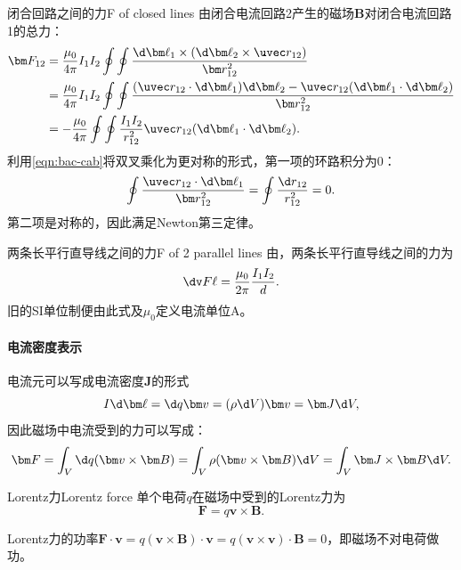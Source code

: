 \begin{example}{闭合回路之间的力}{F of closed lines}
    由闭合电流回路2产生的磁场$\bm B$对闭合电流回路1的总力：
    \begin{align*}
        \bm F_{12}&=\frac{\mu_0}{4\pi}I_1I_2\oint\oint\frac{\d\bm\ell_1\times(\d\bm\ell_2\times\uvec r_{12})}{\bm r_{12}^2}\\
        &=\frac{\mu_0}{4\pi}I_1I_2\oint\oint\frac{(\uvec r_{12}\cdot\d\bm\ell_1)\d\bm\ell_2-\uvec r_{12}(\d\bm\ell_1\cdot\d\bm\ell_2)}{\bm r_{12}^2}\\
        &=-\frac{\mu_0}{4\pi}\oint\oint\frac{I_1I_2}{r_{12}^2}\uvec r_{12}(\d\bm\ell_1\cdot\d\bm\ell_2).
    \end{align*}
    利用\eqref{eqn:bac-cab}将双叉乘化为更对称的形式，第一项的环路积分为0：
    \[
        \oint\frac{\uvec r_{12}\cdot\d\bm\ell_1}{\bm r_{12}^2}=\oint\frac{\d r_{12}}{r_{12}^2}=0.
    \]
    第二项是对称的，因此满足Newton第三定律。
\end{example}
\begin{example}{两条长平行直导线之间的力}{F of 2 parallel lines}
    由，两条长平行直导线之间的力为
    \begin{equation}
        \dv F\ell=\frac{\mu_0}{2\pi}\frac{I_1I_2}d.
    \end{equation}
    旧的SI单位制便由此式及$\mu_0$定义电流单位A。
\end{example}

\paragraph{电流密度表示}

电流元可以写成电流密度$\bm J$的形式
\[
    I\d\bm\ell=\d q\bm v=(\rho\d V)\bm v=\bm J\d V,
\]
因此磁场中电流受到的力可以写成：
\[
    \bm F=\int_V\d q(\bm v\times\bm B)=\int_V\rho(\bm v\times\bm B)\d V=\int_V\bm J\times\bm B\d V.
\]
\begin{definition}
    {Lorentz力}{Lorentz force}
    单个电荷$q$在磁场中受到的Lorentz力为
    \begin{equation}
        \bm F=q\bm v\times\bm B.
    \end{equation}
\end{definition}

\begin{corollary}
    Lorentz力的功率$\bm F\cdot\bm v=q(\bm v\times\bm B)\cdot\bm v=q(\bm v\times\bm v)\cdot\bm B=0$，即磁场不对电荷做功。
\end{corollary}

